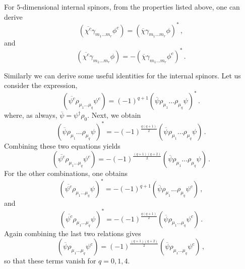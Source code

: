 \documentclass[debug]{phd}
\begin{document}
For $5$-dimensional internal spinors, from the properties listed above, one can derive
%
\begin{equation}
	\left( \overline{\chi^c} \gamma_{m_1 \ldots m_r} \phi^c\right) = \left( \overline{\chi}\gamma_{m_1 \ldots m_r} \phi\right)^*\, ,
\end{equation}
%
and
%
\begin{equation}
	\left( \overline{\chi^c}\gamma_{m_1 \ldots m_r}\phi\right) = -\left( \overline{\chi} \gamma_{m_1 \ldots m_r} \phi^c\right)^*\, .
\end{equation}

Similarly we can derive some useful identities for the internal spinors.
Let us consider the expression,
%
\begin{equation}
	\left( \overline{\psi^c}\rho_{\mu_1 \ldots \mu_q} \psi^c\right) = \left( -1\right)^{q+1} \left( \overline{\psi} \rho_{\mu_1} \ldots \rho_{\mu_q} \psi\right)^*\, .
\end{equation}
%
where, as always, $\overline{\psi}=\psi^{\dagger}\rho_0$. Next, we obtain
%
\begin{equation}
	\left( \overline{\psi}\rho_{\mu_1} \ldots \rho_{\mu_q}\psi\right)^* = - \left( -1\right)^{\frac{q(q+1)}{2}} \left( \overline{\psi} \rho_{\mu_1} \ldots \rho_{\mu_q}\psi\right)\, .
\end{equation}
%
Combining these two equations yields
%
\begin{equation}
	\left( \overline{\psi^c}\rho_{\mu_1 \ldots \mu_q} \psi^c\right) = -\left( -1\right)^{\frac{(q+1)(q+2)}{2}} \left( \overline{\psi} \rho_{\mu_1} \ldots \rho_{\mu_q}\psi\right)\, .
\end{equation}
%
For the other combinations, one obtains
%
\begin{equation}
	\left( \overline{\psi^c}\rho_{\mu_1 \ldots \mu_q}\psi\right)^* = - \left( -1\right)^{q+1} \left( \overline{\psi} \rho_{\mu_1} \ldots \rho_{\mu_q} \psi^c\right)\, ,
\end{equation}
%
and 
%
\begin{equation}
	\left( \overline{\psi^c} \rho_{\mu_1 \ldots \mu_q}\psi\right)^* = -\left( -1\right)^{\frac{q(q+1)}{2}} \left( \overline{\psi} \rho_{\mu_1 \ldots \mu_q} \psi^c\right)\, . 
\end{equation}
%
Again combining the last two relations gives
%
\begin{equation}
	 \left( \overline{\psi}\rho_{\mu_1 \ldots \mu_q} \psi^c\right) = \left( -1\right)^{\frac{(q+1)(q+2)}{2}}\left( \overline{\psi}\rho_{\mu_1 \ldots \mu_q} \psi^c\right)\, ,
\end{equation}
%
so that these terms vanish for $q=0,1,4$. 
\end{document}
